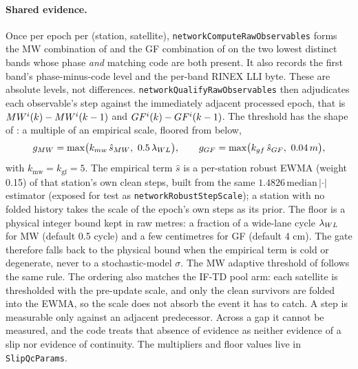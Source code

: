 \documentclass[main.tex]{subfiles}
\begin{document}
\paragraph{Shared evidence.}
Once per epoch per (station, satellite),
\texttt{networkComputeRawObservables} forms the MW combination of
 and the GF combination of  on the two lowest
distinct bands whose phase \emph{and} matching code are both present.
It also records the first band's phase-minus-code level and the
per-band RINEX LLI byte.  These are absolute levels, not differences.
\texttt{networkQualifyRawObservables} then adjudicates each observable's
step against the immediately adjacent processed epoch, that is
$MW^i(k) - MW^i(k-1)$ and $GF^i(k) - GF^i(k-1)$.
The threshold has the shape of : a multiple of an
empirical scale, floored from below,
\begin{equation}
g_{\mwc} = \max\bigl(k_{\mathrm{mw}}\,\hat s_{\mwc},\ 0.5\,\lamwl\bigr),
\qquad
g_{\gfc} = \max\bigl(k_{\mathrm{gf}}\,\hat s_{\gfc},\ \SI{0.04}{m}\bigr),
\label{eq:raw-gates}
\end{equation}
with $k_{\mathrm{mw}} = k_{\mathrm{gf}} = 5$.  The empirical term
$\hat s$ is a per-station robust EWMA (weight 0.15) of that station's own
clean steps, built from the same $1.4826\,\mathrm{median}\,|\cdot|$
estimator (exposed for test as \texttt{networkRobustStepScale}); a station
with no folded history takes the scale of the epoch's own steps as its
prior.  The floor is a physical integer bound kept in raw metres: a
fraction of a wide-lane cycle $\lambda_{WL}$ for MW (default 0.5 cycle) and a few
centimetres for GF (default 4 cm).  The gate therefore falls back to the
physical bound when the empirical term is cold or degenerate, never to a
stochastic-model $\sigma$.  The MW adaptive threshold of
 follows the same rule.  The ordering also matches the
IF-TD pool arm: each satellite is thresholded with the pre-update scale,
and only the clean survivors are folded into the EWMA, so the scale does
not absorb the event it has to catch.  A step is measurable only against
an adjacent predecessor.  Across a gap it cannot be measured, and the
code treats that absence of evidence as neither evidence of a slip nor
evidence of continuity.  The multipliers and floor values live in
\texttt{SlipQcParams}.
\end{document}
